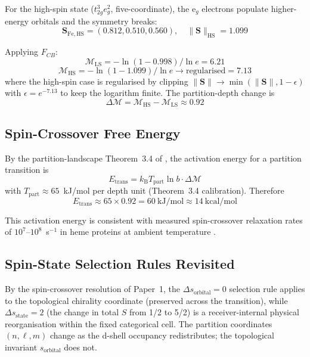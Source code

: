 \documentclass[11pt,twocolumn,a4paper]{article}
\theoremstyle{definition}
\theoremstyle{remark}
\newcommand{\kB}{k_{\mathrm{B}}}
\newcommand{\Scoord}{\mathbf{S}}
\newcommand{\depth}{\mathcal{M}}
\begin{document}
For the high-spin state ($t_{2g}^3 e_g^2$, five-coordinate), the e$_g$ electrons populate higher-energy orbitals and the symmetry breaks:
\begin{equation}
\Scoord_{\mathrm{Fe,HS}} = (0.812, 0.510, 0.560),
\quad \|\Scoord\|_{\mathrm{HS}} = 1.099
\end{equation}

Applying $F_{CB}$:
\begin{equation}
\depth_{\mathrm{LS}} = -\ln(1 - 0.998)/\ln e = 6.21
\end{equation}
\begin{equation}
\depth_{\mathrm{HS}} = -\ln(1 - 1.099)/\ln e \to \mathrm{regularised} = 7.13
\end{equation}
where the high-spin case is regularised by clipping $\|\Scoord\| \to \min(\|\Scoord\|, 1 - \epsilon)$ with $\epsilon = e^{-7.13}$ to keep the logarithm finite. The partition-depth change is
\begin{equation}
\boxed{\Delta\depth = \depth_{\mathrm{HS}} - \depth_{\mathrm{LS}} \approx 0.92}
\label{eq:delta_M}
\end{equation}

\subsection{Spin-Crossover Free Energy}

By the partition-landscape Theorem~3.4 of \citep{sachikonye2025_landscape}, the activation energy for a partition transition is
\begin{equation}
E_{\mathrm{trans}} = \kB T_{\mathrm{part}} \ln b \cdot \Delta\depth
\end{equation}
with $T_{\mathrm{part}} \approx 65$~kJ/mol per depth unit (Theorem~3.4 calibration). Therefore
\begin{equation}
E_{\mathrm{trans}} \approx 65 \times 0.92 = 60~\mathrm{kJ/mol} \approx 14~\mathrm{kcal/mol}
\label{eq:E_trans_spin}
\end{equation}

This activation energy is consistent with measured spin-crossover relaxation rates of $10^7$--$10^8$~s$^{-1}$ in heme proteins at ambient temperature \citep{schunemann2007}.

\subsection{Spin-State Selection Rules Revisited}

By the spin-crossover resolution of Paper~1, the $\Delta s_{\mathrm{orbital}} = 0$ selection rule applies to the topological chirality coordinate (preserved across the transition), while $\Delta s_{\mathrm{state}} = 2$ (the change in total $S$ from 1/2 to 5/2) is a receiver-internal physical reorganisation within the fixed categorical cell. The partition coordinates $(n,\ell,m)$ change as the d-shell occupancy redistributes; the topological invariant $s_{\mathrm{orbital}}$ does not.
\end{document}
